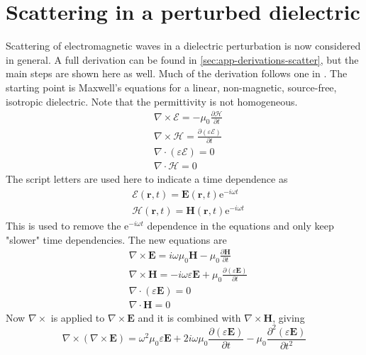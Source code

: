 \documentclass[11pt,twoside]{eitExjobb}
\begin{document}
	\section{Scattering in a perturbed dielectric \label{sec:analytical-scatter}}
	Scattering of electromagnetic waves in a dielectric perturbation is now considered in general. A full derivation can be found in \ref{sec:app-derivations-scatter}, but the main steps are shown here as well. Much of the derivation follows one in \cite{Tatarskii1971}. The starting point is Maxwell's equations for a linear, non-magnetic, source-free, isotropic dielectric. Note that the permittivity is not homogeneous.
	\begin{align*}
		&\nabla \times \bm{\mathcal{E}} = -\mu_0 \frac{\partial \bm{\mathcal{H}}}{\partial t} \\
		&\nabla \times \bm{\mathcal{H}} = \frac{\partial (\varepsilon \bm{\mathcal{E}})}{\partial t} \\
		&\nabla \cdot (\varepsilon \bm{\mathcal{E}}) = 0 \\
		&\nabla \cdot \bm{\mathcal{H}} = 0
	\end{align*}
	The script letters are used here to indicate a time dependence as
	\begin{align*}
		&\bm{\mathcal{E}}(\bm{r},t) = \bm{E}(\bm{r},t) \text{e}^{-i\omega t} \\
		&\bm{\mathcal{H}}(\bm{r},t) = \bm{H}(\bm{r},t) \text{e}^{-i\omega t}
	\end{align*}
	This is used to remove the e$^{-i\omega t}$ dependence in the equations and only keep "slower" time dependencies. The new equations are
	\begin{align}
		&\nabla \times \bm{E} = i\omega \mu_0 \bm{H} - \mu_0 \frac{\partial \bm{H}}{\partial t} \label{eq:an-scatter-faraday} \\
		&\nabla \times \bm{H} = -i\omega \varepsilon \bm{E} + \mu_0 \frac{\partial (\varepsilon \bm{E})}{\partial t} \label{eq:an-scatter-ampere} \\
		&\nabla \cdot (\varepsilon \bm{E}) = 0 \label{eq:an-scatter-gauss} \\
		&\nabla \cdot \bm{H} = 0 \label{eq:an-scatter-magn}
	\end{align}
	Now $\nabla \times$ is applied to $\nabla \times \bm{E}$ and it is combined with $\nabla \times \bm{H}$, giving
	\begin{equation*}
		\nabla \times (\nabla \times \bm{E}) = \omega^2 \mu_0 \varepsilon \bm{E} + 2i\omega \mu_0 \frac{\partial (\varepsilon \bm{E})}{\partial t} - \mu_0 \frac{\partial^2 (\varepsilon \bm{E})}{\partial t^2}
	\end{equation*}
\end{document}
